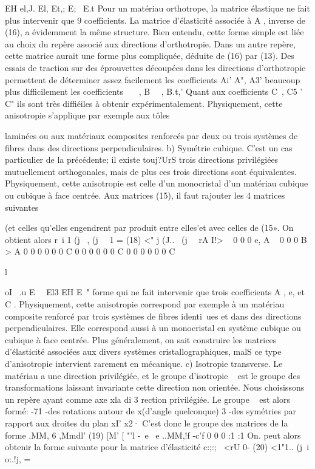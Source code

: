 EH 
el,J. El, 
Et,; 
E;~ 
E.t 
Pour un matériau orthotrope, la matrice élastique ne fait plus intervenir 
que 9 coefficients. La matrice d'élasticité associée à A , inverse de (16), 
a évidemment la même structure. Bien entendu, cette forme simple est liée 
au choix du repère associé aux directions d'orthotropie. Dans un autre repère, 
cette matrice aurait une forme plus compliquée, déduite de (16) par (13). Des essais de traction sur des éprouvettes découpées dans les directions d'orthotropie permettent de déterminer assez facilement les coefficients 
Ai' A", A3' beaucoup plus difficilement les coefficients ~~~, B~~ , B.t,' 
Quant  aux  coefficients  C~,  C5  '  C"  ils sont  très diffiéiles à obtenir  
expérimentalement.  
Physiquement,  cette anisotropie s'applique par exemple  aux  tôles  

laminées ou aux matériaux composites renforcés par deux ou trois systèmes 
de fibres dans des directions perpendiculaires. 
b) Symétrie cubique. C'est un cas particulier de la précédente; il existe 
touj?UrS trois directions privilégiées mutuellement orthogonales, mais de plus ces trois directions sont équivalentes. Physiquement, cette anisotropie est celle d'un monocristal d'un matériau cubique ou cubique à face centrée. Aux matrices (15), il faut rajouter les 4 matrices suivantes 

(et celles qu'elles engendrent par produit entre elles'et avec celles de (15». On obtient alors 
r~i 1 
(j~ , 
(j~~ 1 =
(18) 
<" j
(J..~ (j~~ 
rA I!> ~ 0 0 0 
e,  A  ~  0  0  0  
B  >  A  0  0  0  
0  0  0  C  0  0  
0  0  0  0  C  0  
0  0  0  0  0  C  

l 

oI~ .u 
E~~ 
El3 
EH 
E~" 
forme qui ne fait intervenir que trois coefficients A , e, et C . 
Physiquement, cette anisotropie correspond par exemple à un matériau composite renforcé par trois systèmes de fibres identi~ues et dans des direc­tions perpendiculaires. Elle correspond aussi à un monocristal en système cu­bique ou cubique à face centrée. Plus généralement, on sait construire les matrices d'élasticité associées aux divers systèmes cristallographiques, malS ce type d'anisotropie intervient rarement en mécanique. 
c) Isotropie transverse. Le matériau a une direction privilégiée, et le groupe d'isotropie ~ est le groupe des transformations laissant invariante cette 
direction non orientée. Nous choisissons un repère ayant comme axe xla di­
3 
rection privilégiée. Le groupe ~ est alors formé: 
-71 ­-des rotations autour de x(d'angle quelconque)
3 -des symétries par rapport aux droites du plan 
xI' x2· C'est donc le groupe des matrices de la forme 
.MM, 6 ,Mmdl' 
(19) [M' [ "'l 
-~e ~e ..MM,!f -c'f 
0 0 0
:1 :1 
On. peut alors obtenir la forme suivante pour la matrice d'élasticité 
c:;:;~ 
<rU 
0- 
(20) 
<1"1.. 
(j~i 
o:.!j, 
= 

